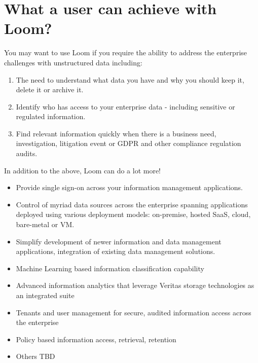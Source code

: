 \documentclass[letterpaper,10pt,english]{sphinxmanual}
\begin{document}
\section{What a user can achieve with Loom?}
\label{\detokenize{loom_getting_started_guide:what-a-user-can-achieve-with-loom}}
You may want to use Loom if you require the ability to address the enterprise challenges with unstructured data including:
\begin{enumerate}
\item {} 
 The need to understand what data you have and why you should keep it, delete it or archive it.

\item {} 
 Identify who has access to your enterprise data - including sensitive or regulated information.

\item {} 
 Find relevant information quickly when there is a business need, investigation, litigation event or GDPR and other compliance regulation audits.

\end{enumerate}

In addition to the above, Loom can do a lot more!
\begin{itemize}
\item {} 
Provide single sign-on across your information management applications.

\item {} 
Control of myriad data sources across the enterprise spanning applications deployed using various deployment models: on-premise, hosted SaaS, cloud, bare-metal or VM.

\item {} 
Simplify development of newer information and data management applications, integration of existing data management solutions.

\item {} 
Machine Learning based information classification capability

\item {} 
Advanced information analytics that leverage Veritas storage technologies as an integrated suite

\item {} 
Tenants and user management for secure, audited information access across the enterprise

\item {} 
Policy based information access, retrieval, retention

\item {} 
Others TBD

\end{itemize}
\end{document}

